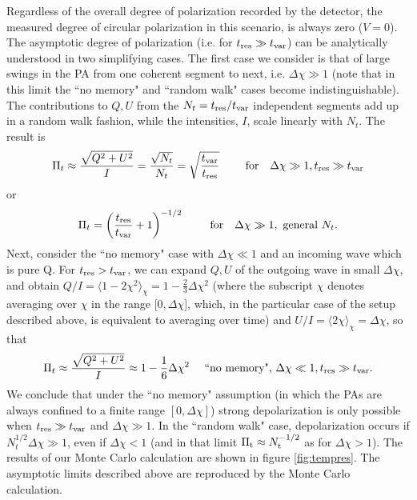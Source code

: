 \documentclass[fleqn,usenatbib]{mnras}
\begin{document}
	Regardless of the overall degree of polarization recorded by the detector, the measured degree of circular polarization in this scenario, is always zero ($V=0$).
	The asymptotic degree of polarization (i.e. for $t_{\rm res}\gg t_{\rm var}$) can be analytically understood in two simplifying cases. The first case we consider is that of large swings in the PA from one coherent segment to next, i.e. $\Delta \chi \gg 1$ (note that in this limit the ``no memory" and ``random walk" cases become indistinguishable).  The contributions to $Q,U$ from the $N_t=t_{\rm res}/t_{\rm var}$ independent segments add up in a random walk fashion, while the intensities, $I$, scale linearly with $N_t$. The result is
	\begin{equation}
		\label{eq:delchigg1}
		\Pi_t \approx \frac{\sqrt{Q^2 +U^2}}{ I }=\frac{\sqrt{N_t}}{N_t}=\sqrt{\frac{t_{\rm var}}{t_{\rm res}}} \quad \quad \mbox { for}\quad \Delta \chi \gg 1, t_{\rm res}\gg t_{\rm var}
	\end{equation}
	or 
	\begin{equation}
		\Pi_t=\left(\frac{t_{\rm res}}{t_{\rm var}}+1\right)^{-1/2} \quad \quad \mbox { for}\quad \Delta \chi \gg 1,\mbox{ general $N_t$}.
	\end{equation}
	Next, consider the ``no memory" case with $\Delta \chi\ll1$ and an incoming wave which is pure Q. For $t_{\rm res}>t_{\rm var}$, we can expand $Q,U$ of the outgoing wave in small $\Delta\chi$, and obtain $Q/I=\langle 1-2\chi^2 \rangle_{\chi}=1-\frac{2}{3}\Delta \chi^2$ (where the subscript $\chi$ denotes averaging over $\chi$ in the range [$0,\Delta\chi$], which, in the particular case of the setup described above, is equivalent to averaging over time) and $U/I=\langle 2\chi \rangle_{\chi} =\Delta \chi$, so that
	\begin{equation}
		\label{eq:delchill1}
		\Pi_t \approx \frac{\sqrt{Q^2 +U^2}}{I}\approx 1-\frac{1}{6} \Delta \chi^2 \quad \mbox { ``no memory", } \Delta \chi \ll 1, t_{\rm res}\gg t_{\rm var}.
	\end{equation}
	We conclude that under the ``no memory" assumption (in which the PAs are always confined to a finite range $[0,\Delta \chi]$) strong depolarization is only possible when $t_{\rm res}\gg t_{\rm var}$ and $\Delta \chi\gg 1$. In the ``random walk" case, depolarization occurs if $N_t^{1/2}\Delta \chi \gg 1$, even if $\Delta \chi<1$ (and in that limit $\Pi_{\rm t}\approx N_{\rm t}^{-1/2}$ as for $\Delta \chi>1$).
	The results of our Monte Carlo calculation are shown in figure \ref{fig:tempres}. The asymptotic limits described above are reproduced by the Monte Carlo calculation.
	
\end{document}
